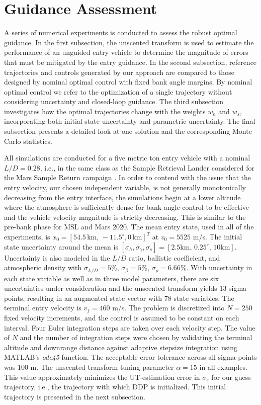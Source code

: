 \documentclass[journal ]{new-aiaa}
\begin{document}
\section*{Guidance Assessment}
A series of numerical experiments is conducted to assess the robust optimal guidance. In the first subsection, the unscented transform is used to estimate the performance of an unguided entry vehicle to determine the magnitude of errors that must be mitigated by the entry guidance. In the second subsection, reference trajectories and controls generated by our approach are compared to those designed by nominal optimal control with fixed bank angle margins. By nominal optimal control we refer to the optimization of a single trajectory without considering uncertainty and closed-loop guidance. The third subsection investigates how the optimal trajectories change with the weights $w_h$ and $w_s$, incorporating both initial state uncertainty and parametric uncertainty. The final subsection presents a detailed look at one solution and the corresponding Monte Carlo statistics.

All simulations are conducted for a five metric ton entry vehicle with a nominal $L/D=0.28$, i.e., in the same class as the Sample Retrieval Lander considered for the Mars Sample Return campaign \cite{MSR}. 
In order to contend with the issue that the entry velocity, our chosen independent variable, is not generally monotonically decreasing from the entry interface, 
the simulations begin at a lower altitude where the atmosphere is sufficiently dense for bank angle control to be effective and the vehicle velocity magnitude is strictly decreasing. This is similar to the pre-bank phase for MSL and Mars 2020. The mean entry state, used in all of the experiments, is $x_0 = [54.5\,\mathrm{km},\,-11.5^{\circ}, 0\,\mathrm{km}]^T$ at $v_0 = 5525$ m/s. The initial state uncertainty around the mean is $[\sigma_h, \sigma_{\gamma}, \sigma_s ] = [2.5 \mathrm{km},\, 0.25^{\circ},\, 10\mathrm{ km}]$. Uncertainty is also modeled in the $L/D$ ratio, ballistic coefficient, and atmospheric density with $\sigma_{L/D} = 5\%$, $\sigma_{\beta} = 5\%$, $\sigma_{\rho} = 6.66\%$. With uncertainty in each state variable as well as in three model parameters, there are six uncertainties under consideration and the unscented transform yields 13 sigma points, resulting in an augmented state vector with 78 state variables. The terminal entry velocity is $v_f=460$ m/s. The problem is discretized into $N=250$ fixed velocity increments, and the control is assumed to be constant on each interval. Four Euler integration steps are taken over each velocity step. The value of $ N $ and the number of integration steps were chosen by validating the terminal altitude and downrange distance against adaptive stepsize integration using MATLAB's \textit{ode45} function. The acceptable error tolerance across all sigma points was 100 m. The unscented transform tuning parameter $\alpha=15$ in all examples. This value approximately minimizes the UT-estimation error in $\sigma_s$ for our guess trajectory, i.e., the trajectory with which DDP is initialized. This initial trajectory is presented in the next subsection.
\end{document}
